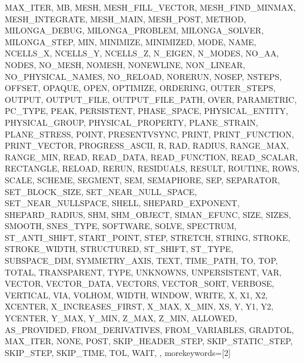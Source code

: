 {{      MAX_ITER,
      MB,
      MESH,
      MESH_FILL_VECTOR,
      MESH_FIND_MINMAX,
      MESH_INTEGRATE,
      MESH_MAIN,
      MESH_POST,
      METHOD,
      MILONGA_DEBUG,
      MILONGA_PROBLEM,
      MILONGA_SOLVER,
      MILONGA_STEP,
      MIN,
      MINIMIZE,
      MINIMIZED,
      MODE,
      NAME,
      NCELLS_X,
      NCELLS_Y,
      NCELLS_Z,
      N_EIGEN,
      N_MODES,
      NO_AA,
      NODES,
      NO_MESH,
      NOMESH,
      NONEWLINE,
      NON_LINEAR,
      NO_PHYSICAL_NAMES,
      NO_RELOAD,
      NORERUN,
      NOSEP,
      NSTEPS,
      OFFSET,
      OPAQUE,
      OPEN,
      OPTIMIZE,
      ORDERING,
      OUTER_STEPS,
      OUTPUT,
      OUTPUT_FILE,
      OUTPUT_FILE_PATH,
      OVER,
      PARAMETRIC,
      PC_TYPE,
      PEAK,
      PERSISTENT,
      PHASE_SPACE,
      PHYSICAL_ENTITY,
      PHYSICAL_GROUP,
      PHYSICAL_PROPERTY,
      PLANE_STRAIN,
      PLANE_STRESS,
      POINT,
      PRESENTVSYNC,
      PRINT,
      PRINT_FUNCTION,
      PRINT_VECTOR,
      PROGRESS_ASCII,
      R,
      RAD,
      RADIUS,
      RANGE_MAX,
      RANGE_MIN,
      READ,
      READ_DATA,
      READ_FUNCTION,
      READ_SCALAR,
      RECTANGLE,
      RELOAD,
      RERUN,
      RESIDUALS,
      RESULT,
      ROUTINE,
      ROWS,
      SCALE,
      SCHEME,
      SEGMENT,
      SEM,
      SEMAPHORE,
      SEP,
      SEPARATOR,
      SET_BLOCK_SIZE,
      SET_NEAR_NULL_SPACE,
      SET_NEAR_NULLSPACE,
      SHELL,
      SHEPARD_EXPONENT,
      SHEPARD_RADIUS,
      SHM,
      SHM_OBJECT,
      SIMAN_EFUNC,
      SIZE,
      SIZES,
      SMOOTH,
      SNES_TYPE,
      SOFTWARE,
      SOLVE,
      SPECTRUM,
      ST_ANTI_SHIFT,
      START_POINT,
      STEP,
      STRETCH,
      STRING,
      STROKE,
      STROKE_WIDTH,
      STRUCTURED,
      ST_SHIFT,
      ST_TYPE,
      SUBSPACE_DIM,
      SYMMETRY_AXIS,
      TEXT,
      TIME_PATH,
      TO,
      TOP,
      TOTAL,
      TRANSPARENT,
      TYPE,
      UNKNOWNS,
      UNPERSISTENT,
      VAR,
      VECTOR,
      VECTOR_DATA,
      VECTORS,
      VECTOR_SORT,
      VERBOSE,
      VERTICAL,
      VIA,
      VOLHOM,
      WIDTH,
      WINDOW,
      WRITE,
      X,
      X1,
      X2,
      XCENTER,
      X_INCREASES_FIRST,
      X_MAX,
      X_MIN,
      XS,
      Y,
      Y1,
      Y2,
      YCENTER,
      Y_MAX,
      Y_MIN,
      Z_MAX,
      Z_MIN,
      ALLOWED,
      AS_PROVIDED,
      FROM_DERIVATIVES,
      FROM_VARIABLES,
      GRADTOL,
      MAX_ITER,
      NONE,
      POST,
      SKIP_HEADER_STEP,
      SKIP_STATIC_STEP,
      SKIP_STEP,
      SKIP_TIME,
      TOL,
      WAIT,
},
morekeywords={[2]
}}

